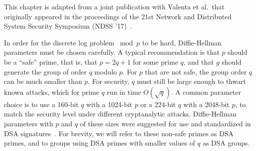 


%

This chapter is adapted from a joint publication with Valenta et al.\ that
originally appeared in the proceedings of the 21st Network and Distributed
System Security Symposium (NDSS '17)~\cite{subgroup-2017}.

In order for the discrete log problem $\bmod p$ to be hard, Diffie-Hellman parameters
must be chosen carefully. A typical recommendation is that $p$ should be a
``safe'' prime, that is, that $p = 2q+1$ for some prime $q$, and that $g$
should generate the group of order $q$ modulo $p$. For $p$ that are not safe,
the group order $q$ can be much smaller than $p$. For security, $q$ must still
be large enough to thwart known attacks, which for prime $q$ run in time
$O(\sqrt{q})$. A common parameter choice is to use a 160-bit $q$ with a
1024-bit $p$ or a 224-bit $q$ with a 2048-bit $p$, to match the security level
under different cryptanalytic attacks. Diffie-Hellman parameters with $p$ and
$q$ of these sizes were suggested for use and standardized in DSA
signatures~\cite{fips186}. For brevity, we will refer to these non-safe primes as
DSA primes, and to groups using DSA primes with smaller values of $q$ as  DSA
groups.

